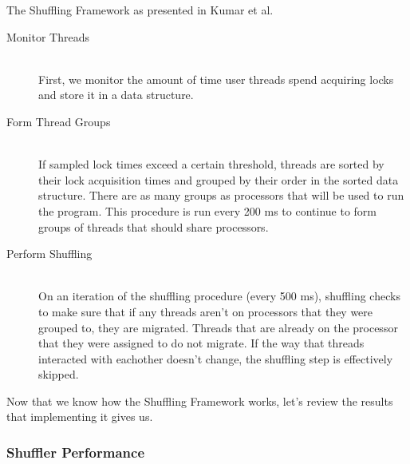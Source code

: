 \documentclass{sig-alternate}
\begin{document}
\begin{algorithm}


	\caption{The Shuffling Framework
	as presented in Kumar et al.~\cite{KumarEtal:2014}}\label{alg:shuffler}
\end{algorithm}

\begin{description}
\item [Monitor Threads] \ \\
First, we monitor the amount of time user threads spend acquiring locks and store it in a data structure. 

\item [Form Thread Groups] \ \\
If sampled lock times exceed a certain threshold, threads are sorted by their lock acquisition times and grouped by their order in the sorted data structure. There are as many groups as processors that will be used to run the program. This procedure is run every 200 ms to continue to form groups of threads that should share processors.

\item [Perform Shuffling] \ \\
On an iteration of the shuffling procedure (every 500 ms), shuffling checks to make sure that if any threads aren't on processors that they were grouped to, they are migrated. Threads that are already on the processor that they were assigned to do not migrate. If the way that threads interacted with eachother doesn't change, the shuffling step is effectively skipped.~\cite{KumarEtal:2014}
\end{description}

Now that we know how the Shuffling Framework works, let's review the results that implementing it gives us.

\subsubsection{Shuffler Performance}
\label{sec:shuf_performance}
\end{document}
